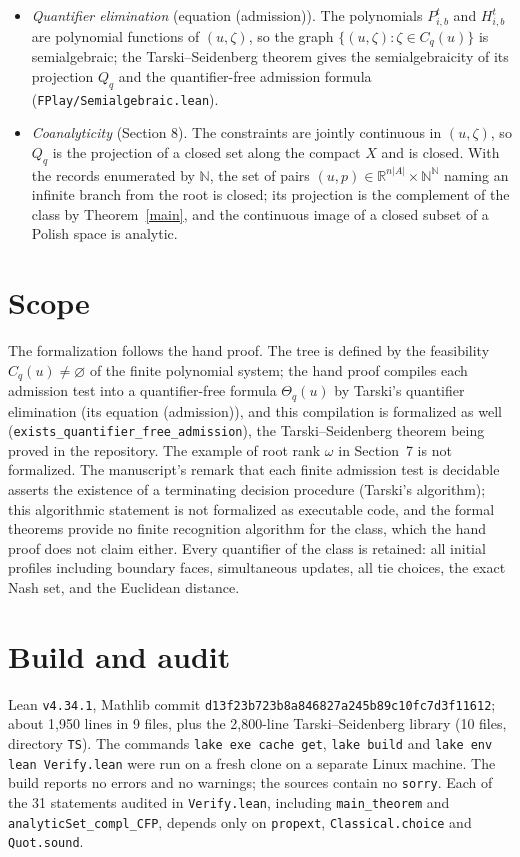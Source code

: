 \documentclass[11pt]{article}
\theoremstyle{definition}
\newcommand{\N}{\mathbb N}
\newcommand{\R}{\mathbb R}
\begin{document}
\begin{itemize}
\item \emph{Quantifier elimination} (equation (admission)). The polynomials $P^t_{i,b}$ and $H^t_{i,b}$ are polynomial functions of $(u,\zeta)$, so the graph $\{(u,\zeta):\zeta\in C_q(u)\}$ is semialgebraic; the Tarski--Seidenberg theorem gives the semialgebraicity of its projection $Q_q$ and the quantifier-free admission formula (\texttt{FPlay/Semialgebraic.lean}).
\item \emph{Coanalyticity} (Section 8). The constraints are jointly continuous in $(u,\zeta)$, so $Q_q$ is the projection of a closed set along the compact $X$ and is closed. With the records enumerated by $\N$, the set of pairs $(u,p)\in\R^{n|A|}\times\N^{\N}$ naming an infinite branch from the root is closed; its projection is the complement of the class by Theorem~\ref{main}, and the continuous image of a closed subset of a Polish space is analytic.
\end{itemize}

\section{Scope}

The formalization follows the hand proof. The tree is defined by the feasibility $C_q(u)\ne\varnothing$ of the finite polynomial system; the hand proof compiles each admission test into a quantifier-free formula $\Theta_q(u)$ by Tarski's quantifier elimination (its equation (admission)), and this compilation is formalized as well (\texttt{exists\_quantifier\_free\_admission}), the Tarski--Seidenberg theorem being proved in the repository. The example of root rank $\omega$ in Section~7 is not formalized. The manuscript's remark that each finite admission test is decidable asserts the existence of a terminating decision procedure (Tarski's algorithm); this algorithmic statement is not formalized as executable code, and the formal theorems provide no finite recognition algorithm for the class, which the hand proof does not claim either. Every quantifier of the class is retained: all initial profiles including boundary faces, simultaneous updates, all tie choices, the exact Nash set, and the Euclidean distance.

\section{Build and audit}

Lean \texttt{v4.34.1}, Mathlib commit \texttt{d13f23b723b8a846827a245b89c10fc7d3f11612}; about 1,950 lines in 9 files, plus the 2,800-line Tarski--Seidenberg library (10 files, directory \texttt{TS}). The commands \texttt{lake exe cache get}, \texttt{lake build} and \texttt{lake env lean Verify.lean} were run on a fresh clone on a separate Linux machine. The build reports no errors and no warnings; the sources contain no \texttt{sorry}. Each of the 31 statements audited in \texttt{Verify.lean}, including \texttt{main\_theorem} and \texttt{analyticSet\_compl\_CFP}, depends only on \texttt{propext}, \texttt{Classical.choice} and \texttt{Quot.sound}.
\end{document}

